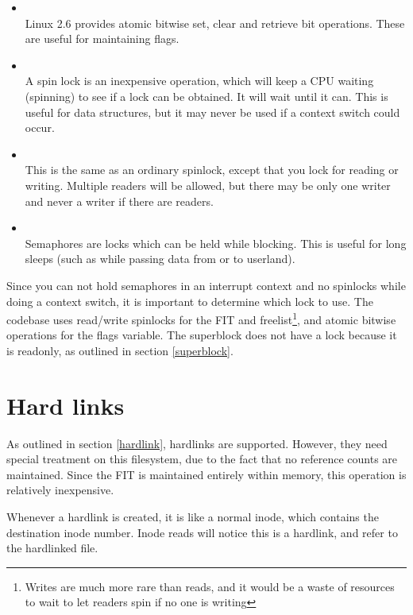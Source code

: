 \begin{itemize}
\item {} \\
Linux 2.6 provides atomic bitwise set, clear and retrieve bit operations. These are useful for maintaining flags.
\item {} \\
A spin lock is an inexpensive operation, which will keep a CPU waiting (spinning) to see if a lock can be obtained. It will wait until it can. This is useful for data structures, but it may never be used if a context switch could occur.
\item {} \\
This is the same as an ordinary spinlock, except that you lock for reading or writing. Multiple readers will be allowed, but there may be only one writer and never a writer if there are readers.
\item {} \\
Semaphores are locks which can be held while blocking. This is useful for long sleeps (such as while passing data from or to userland).
\end{itemize}
\standoff

Since you can not hold semaphores in an interrupt context and no spinlocks while doing a context switch, it is important to determine which lock to use. The codebase uses read/write spinlocks for the FIT and freelist\footnote{Writes are much more rare than reads, and it would be a waste of resources to wait to let readers spin if no one is writing}, and atomic bitwise operations for the flags variable. The superblock does not have a lock because it is readonly, as outlined in section \ref{superblock}.

\section{Hard links}
\label{impl_hardlinks}

As outlined in section \ref{hardlink}, hardlinks are supported. However, they need special treatment on this filesystem, due to the fact that no reference counts are maintained. Since the FIT is maintained entirely within memory, this operation is relatively inexpensive.

Whenever a hardlink is created, it is like a normal inode, which contains the destination inode number. Inode reads will notice this is a hardlink, and refer to the hardlinked file.


